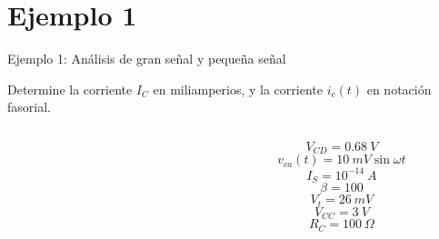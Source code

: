 \documentclass[t,aspectratio=169]{beamer}
\begin{document}
\section{Ejemplo 1}
\begin{frame}{Ejemplo 1: Análisis de gran señal y pequeña señal}

Determine la corriente $I_C$ en miliamperios, y la corriente $i_c(t)$ en notación fasorial.

\begin{columns}
\begin{column}{0.5\textwidth}

\begin{figure}[H]
    \centering
\end{figure}

\end{column}
\begin{column}{0.5\textwidth}

\[ V_{CD} = 0.68\ V \]
\[ v_{ca}(t) = 10\ mV \sin \omega t \]
\[ I_S = 10^{-14}\ A \]
\[ \beta = 100 \]
\[ V_t = 26\ mV \]
\[ V_{CC} = 3\ V \]
\[ R_C = 100\ \Omega \]

\end{column}
\end{columns}
    
\end{frame}
\end{document}
